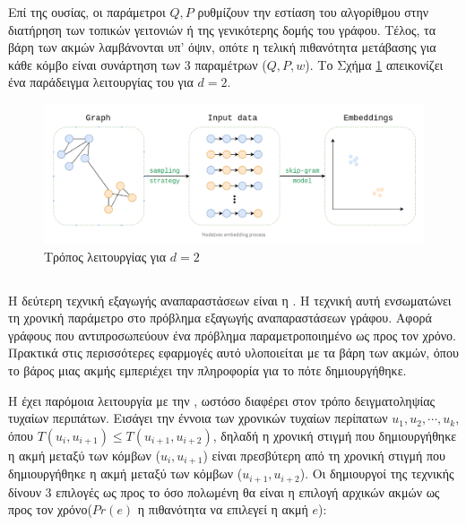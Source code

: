 Επί της ουσίας, οι παράμετροι \(Q,P\) ρυθμίζουν την εστίαση του αλγορίθμου στην διατήρηση
των τοπικών γειτονιών ή της γενικότερης δομής του γράφου. Τέλος, τα βάρη των ακμών
λαμβάνονται υπ' όψιν, οπότε η τελική πιθανότητα μετάβασης για κάθε κόμβο είναι συνάρτηση των
3 παραμέτρων (\(Q,P,w\)). Το Σχήμα \ref{figure1.7} απεικονίζει ένα παράδειγμα λειτουργίας
του  για \(d = 2\).

\begin{figure}[!ht] \centering
\includegraphics[scale = 0.3]{static/figures/n2v_figure.png} 
\caption{Τρόπος λειτουργίας  για \(d = 2\) \cite{Node2VecImpl}}
\label{figure1.7}
\end{figure}

\subsection{} \label{CTDNE}

Η δεύτερη τεχνική εξαγωγής αναπαραστάσεων είναι η  \cite{CTDNE}. Η τεχνική αυτή ενσωματώνει τη χρονική παράμετρο στο
πρόβλημα εξαγωγής αναπαραστάσεων γράφου. Αφορά γράφους που αντιπροσωπεύουν ένα πρόβλημα
παραμετροποιημένο ως προς τον χρόνο. Πρακτικά στις περισσότερες εφαρμογές αυτό υλοποιείται
με τα βάρη των ακμών, όπου το βάρος μιας ακμής εμπεριέχει την πληροφορία για το πότε
δημιουργήθηκε.

Η  έχει παρόμοια λειτουργία με την , ωστόσο διαφέρει στον τρόπο
δειγματοληψίας τυχαίων περιπάτων. Εισάγει την έννοια των χρονικών τυχαίων περίπατων 
\({u_1, u_2,\cdots,u_k}\), όπου \(T(u_i,u_{i+1}) \leq T(u_{i+1},u_{i+2})\), δηλαδή η χρονική
στιγμή που δημιουργήθηκε η ακμή μεταξύ των κόμβων (\(u_i,u_{i+1}\)) είναι πρεσβύτερη από τη
χρονική στιγμή που δημιουργήθηκε η ακμή μεταξύ των κόμβων (\(u_{i+1},u_{i+2}\)). 
Οι δημιουργοί της τεχνικής δίνουν 3 επιλογές ως προς το όσο πολωμένη θα είναι η επιλογή
αρχικών ακμών ως προς τον χρόνο(\(Pr(e)\) η πιθανότητα να επιλεγεί η ακμή \(e\)):


